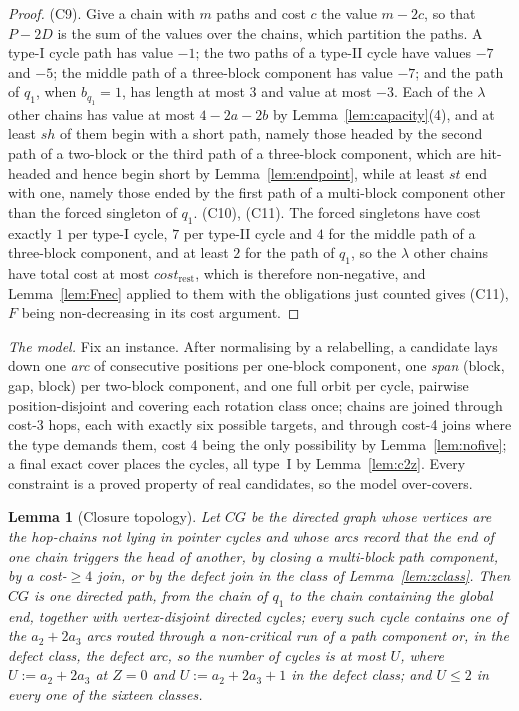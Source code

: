 \documentclass[10pt]{article}
\newtheorem{lemma}[theorem]{Lemma}
\theoremstyle{remark}
\theoremstyle{plain}
\begin{document}
\begin{proof}
(C9).  Give a chain with $m$ paths and cost $c$ the value $m-2c$, so
that $P-2D$ is the sum of the values over the chains, which partition
the paths.  A type-I cycle path has value $-1$; the two paths of a
type-II cycle have values $-7$ and $-5$; the middle path of a
three-block component has value $-7$; and the path of $q_1$, when
$b_{q_1}=1$, has length at most $3$ and value at most $-3$.  Each of
the $\lambda$ other chains has value at most $4-2a-2b$ by
Lemma~\ref{lem:capacity}(4), and at least $\mathit{sh}$ of them begin
with a short path, namely those headed by the second path of a
two-block or the third path of a three-block component, which are
hit-headed and hence begin short by Lemma~\ref{lem:endpoint}, while at
least $\mathit{st}$ end with one, namely those ended by the first path
of a multi-block component other than the forced singleton of $q_1$.
(C10), (C11).  The forced singletons have cost exactly $1$ per type-I
cycle, $7$ per type-II cycle and $4$ for the middle path of a
three-block component, and at least $2$ for the path of $q_1$, so the
$\lambda$ other chains have total cost at most
$\mathit{cost}_{\mathrm{rest}}$, which is therefore non-negative, and
Lemma~\ref{lem:Fnec} applied to them with the obligations just counted
gives (C11), $F$ being non-decreasing in its cost argument.
\end{proof}

\emph{The model.}  Fix an instance.  After normalising by a relabelling,
a candidate lays down one \emph{arc} of consecutive positions per
one-block component, one \emph{span} (block, gap, block) per two-block
component, and one full orbit per cycle, pairwise position-disjoint and
covering each rotation class once; chains are joined through cost-3
hops, each with exactly six possible targets, and through cost-4 joins
where the type demands them, cost $4$ being the only possibility by
Lemma~\ref{lem:nofive}; a final exact cover places the cycles, all
type~I by Lemma~\ref{lem:c2z}.  Every constraint is a proved property
of real candidates, so the model over-covers.

\begin{lemma}[Closure topology]\label{lem:closure}
Let $CG$ be the directed graph whose vertices are the hop-chains not
lying in pointer cycles and whose arcs record that the end of one chain
triggers the head of another, by closing a multi-block path component,
by a cost-$\ge4$ join, or by the defect join in the class of
Lemma~\ref{lem:zclass}.  Then $CG$ is one directed path, from the chain
of $q_1$ to the chain containing the global end, together with
vertex-disjoint directed cycles; every such cycle contains one of the
$a_2+2a_3$ arcs routed through a non-critical run of a path component
or, in the defect class, the defect arc, so the number of cycles is at
most $U$, where $U:=a_2+2a_3$ at $Z=0$ and $U:=a_2+2a_3+1$ in the
defect class; and $U\le 2$ in every one of the sixteen classes.
\end{lemma}
\end{document}
